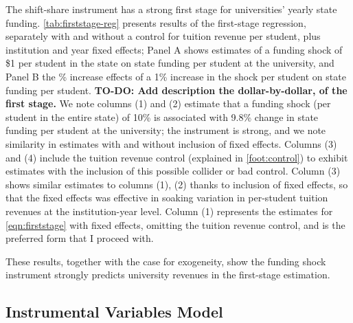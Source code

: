 The shift-share instrument has a strong first stage for universities' yearly state funding.
\autoref{tab:firststage-reg} presents results of the first-stage regression, separately with and without a control for tuition revenue per student, plus institution and year fixed effects;
Panel A shows estimates of a funding shock of \$1 per student in the state on state funding per student at the university, and Panel B the \% increase effects of a 1\% increase in the shock per student on state funding per student.
\textbf{TO-DO:
    Add description the dollar-by-dollar, of the first stage.
}
We note columns (1) and (2) estimate that a funding shock (per student in the entire state) of 10\% is associated with 9.8\% change in state funding per student at the university; the instrument is strong, and we note similarity in estimates with and without inclusion of fixed effects.
Columns (3) and (4) include the tuition revenue control (explained in \autoref{foot:control}) to exhibit estimates with the inclusion of this possible collider or bad control.
Column (3) shows similar estimates to columns (1), (2) thanks to inclusion of fixed effects, so that the fixed effects was effective in soaking variation in per-student tuition revenues at the institution-year level.
Column (1) represents the estimates for \autoref{eqn:firststage} with fixed effects, omitting the tuition revenue control, and is the preferred form that I proceed with.

These results, together with the case for exogeneity, show the funding shock instrument strongly predicts university revenues in the first-stage estimation.


\subsection{Instrumental Variables Model}
\label{sec:iv-model-uni}

